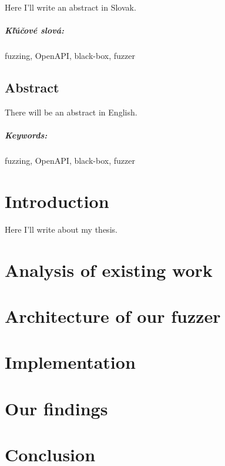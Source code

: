 \documentclass[12pt, twoside]{book}
\begin{document}
Here I'll write an abstract in Slovak.

\paragraph*{Kľúčové slová:} fuzzing, OpenAPI, black-box, fuzzer


\newpage
\section*{Abstract}

There will be an abstract in English.

\paragraph*{Keywords:} fuzzing, OpenAPI, black-box, fuzzer




\newpage

\tableofcontents



\newpage



\mainmatter

\chapter{Introduction}
Here I'll write about my thesis.



\chapter{Analysis of existing work}
\chapter{Architecture of our fuzzer}
\chapter{Implementation}
\chapter{Our findings}
\chapter{Conclusion}




\newpage

\backmatter

\thispagestyle{empty}
\clearpage



\end{document}
